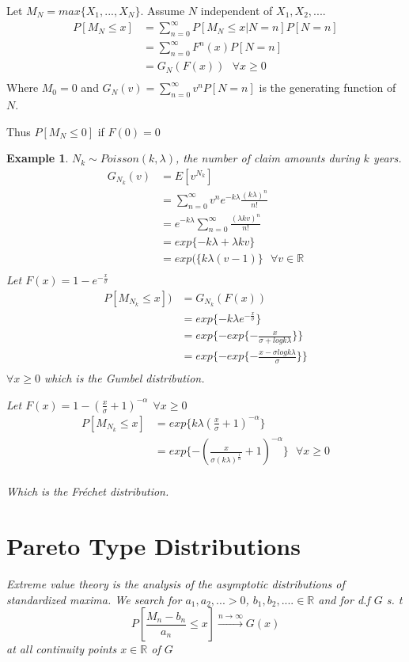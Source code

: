 \documentclass[11pt,a4paper,oneside]{article}
\newtheorem{exm}{Example}[section]
\begin{document}
Let $M_N=max\{X_1,...,X_N\}$. Assume $N$ independent of $X_1,X_2,....$
\begin{align*}
P[M_N\leq x]&=\displaystyle\sum_{n=0}^{\infty}P[M_N\leq x|N=n]P[N=n]\\
&=\displaystyle\sum_{n=0}^{\infty}F^n(x)P[N=n]\\
&=G_N(F(x))\ \ \ \forall x\geq 0\\
\end{align*}
Where $M_0=0$ and $G_N(v)=\displaystyle\sum_{n=0}^{\infty}v^nP[N=n]$ is the generating function of $N$.

Thus $P[M_N\leq 0]$ if $F(0)=0$

\begin{exm}$N_k\sim Poisson(k,\lambda)$, the number of claim amounts during $k$ years.
\begin{align*}
G_{N_k}(v)&=E[v^{N_k}]\\
&=\displaystyle\sum_{n=0}^{\infty}v^ne^{-k\lambda}\frac{(k\lambda)^n}{n!}\\
&=e^{-k\lambda}\displaystyle\sum_{n=0}^{\infty}\frac{(\lambda kv)^n}{n!}\\
&=exp\{-k\lambda+\lambda k v\}\\
&=exp(\{k\lambda(v-1)\}\ \ \ \forall v\in\mathbb{R}\\
\end{align*}
Let $F(x)=1-e^{-\frac{x}{\sigma}}$
\begin{align*}
P[M_{N_k}\leq x])&=G_{N_k}(F(x))\\
&=exp\{-k\lambda e^{-\frac{x}{\sigma}}\}\\
&=exp\{-exp\{-\frac{x}{\sigma+log k\lambda}\}\}\\
&=exp\{-exp\{-\frac{x-\sigma log  k\lambda}{\sigma}\}\}\\
\end{align*}
$\forall x\geq 0 $ which is the Gumbel distribution.

Let $F(x)=1-(\frac{x}{\sigma}+1)^{-\alpha}\ \ \forall x\geq 0$
\begin{align*}
P[M_{N_k}\leq x]&=exp\{k\lambda(\frac{x}{\sigma}+1)^{-\alpha}\}\\
&=exp\{-(\frac{x}{\sigma(k\lambda)^{\frac{1}{\alpha}}}+1)^{-\alpha}\}\ \ \ \forall x \geq 0\\
\end{align*}

Which is the Fréchet distribution.


\section{Pareto Type Distributions}
Extreme value theory is the analysis of the asymptotic distributions of standardized maxima.
We search for $a_1,a_2,...>0$, $b_1,b_2,....\in\mathbb{R}$ and for d.f $G$ s. t
$$P[\frac{M_n-b_n}{a_n}\leq x]\xrightarrow{n\rightarrow\infty}G(x)$$
at all continuity points $x\in\mathbb{R}$ of $G$


\end{exm}
\end{document}
